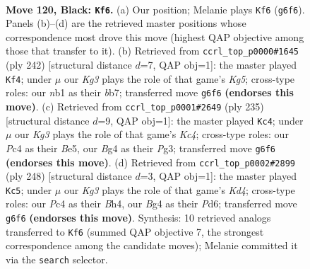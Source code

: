 \documentclass[11pt]{article}
\begin{document}
\clearpage

\begin{figure}[p]\centering
\begin{subfigure}{0.46\textwidth}\centering
\resizebox{\linewidth}{!}{%
\newchessgame
\chessboard[
  setfen={5B2/8/6k1/8/p1p3b1/8/5K2/1N6 b - - 95 120},
  showmover=false,
  pgfstyle=straightmove, color=movearrow, markmove={g6-f6}
]}
\caption{}
\end{subfigure}\hfill
\begin{subfigure}{0.46\textwidth}\centering
\resizebox{\linewidth}{!}{%
\newchessgame
\chessboard[
  setfen={5B2/Pb6/4k3/2P3K1/8/8/8/8 w - - 13 122},
  showmover=false,
  pgfstyle=straightmove, color=movearrow, markmove={g5-f4}
]}
\caption{}
\end{subfigure}
\\[4pt]
\begin{subfigure}{0.46\textwidth}\centering
\resizebox{\linewidth}{!}{%
\newchessgame
\chessboard[
  setfen={8/8/8/2k1b3/4B3/6pp/8/5K2 b - - 77 118},
  showmover=false,
  pgfstyle=straightmove, color=movearrow, markmove={c5-c4}
]}
\caption{}
\end{subfigure}\hfill
\begin{subfigure}{0.46\textwidth}\centering
\resizebox{\linewidth}{!}{%
\newchessgame
\chessboard[
  setfen={2k5/6P1/3P4/8/3K3B/1b6/8/8 w - - 33 125},
  showmover=false,
  pgfstyle=straightmove, color=movearrow, markmove={d4-c5}
]}
\caption{}
\end{subfigure}
\caption{\textbf{Move 120, Black: \texttt{Kf6}.} (a) Our position; Melanie plays \texttt{Kf6} (\texttt{g6f6}). Panels (b)--(d) are the retrieved master positions whose correspondence most drove this move (highest QAP objective among those that transfer to it). (b) Retrieved from \texttt{ccrl\_top\_p0000\#1645} (ply 242) [structural distance $d$=7, QAP obj=1]: the master played \texttt{Kf4}; under $\mu$ our \emph{Kg3} plays the role of that game's \emph{Kg5}; cross-type roles: our \emph{n}b1 as their \emph{b}b7; transferred move \texttt{g6f6} \textbf{(endorses this move)}. (c) Retrieved from \texttt{ccrl\_top\_p0001\#2649} (ply 235) [structural distance $d$=9, QAP obj=1]: the master played \texttt{Kc4}; under $\mu$ our \emph{Kg3} plays the role of that game's \emph{Kc4}; cross-type roles: our \emph{P}c4 as their \emph{B}e5, our \emph{B}g4 as their \emph{P}g3; transferred move \texttt{g6f6} \textbf{(endorses this move)}. (d) Retrieved from \texttt{ccrl\_top\_p0002\#2899} (ply 248) [structural distance $d$=3, QAP obj=1]: the master played \texttt{Kc5}; under $\mu$ our \emph{Kg3} plays the role of that game's \emph{Kd4}; cross-type roles: our \emph{P}c4 as their \emph{B}h4, our \emph{B}g4 as their \emph{P}d6; transferred move \texttt{g6f6} \textbf{(endorses this move)}. Synthesis: 10 retrieved analogs transferred to \texttt{Kf6} (summed QAP objective 7, the strongest correspondence among the candidate moves); Melanie committed it via the \texttt{search} selector.}
\label{fig:thought-m239}
\end{figure}
\end{document}
